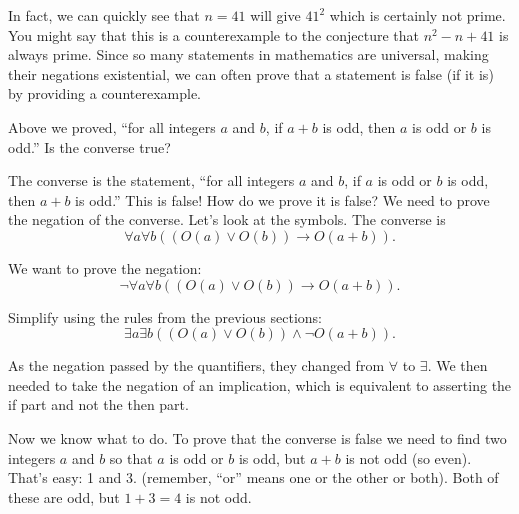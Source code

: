 \documentclass[11pt,]{book}
\theoremstyle{ptxplainnotitle}
\theoremstyle{ptxplaintitle}
\theoremstyle{ptxdefinitionnotitle}
\theoremstyle{ptxdefinitiontitle}
\theoremstyle{ptxdefinitionnotitle}
\theoremstyle{ptxdefinitiontitle}
\theoremstyle{ptxdefinitionnotitle}
\theoremstyle{ptxdefinitiontitle}
\theoremstyle{ptxdefinitiontitlenonumber}
\theoremstyle{ptxdefinitiontitlenonumber}
\numberwithin{equation}{chapter}
\newcommand{\imp}{\rightarrow}
\begin{document}
\par
\hypertarget{p-2351}{}%
In fact, we can quickly see that \(n = 41\) will give \(41^2\) which is certainly not prime. You might say that this is a counterexample to the conjecture that \(n^2 - n + 41\) is always prime. Since so many statements in mathematics are universal, making their negations existential, we can often prove that a statement is false (if it is) by providing a counterexample.%
\begin{example}\label{example-71}
\hypertarget{p-2352}{}%
Above we proved, ``for all integers \(a\) and \(b\), if \(a+b\) is odd, then \(a\) is odd or \(b\) is odd.'' Is the converse true?%
\par\smallskip%
\noindent\textbf{}\hypertarget{solution-258}{}\hypertarget{p-2353}{}%
The converse is the statement, ``for all integers \(a\) and \(b\), if \(a\) is odd or \(b\) is odd, then \(a + b\) is odd.'' This is false! How do we prove it is false? We need to prove the negation of the converse. Let's look at the symbols. The converse is%
\begin{equation*}
\forall a \forall b ((O(a) \vee O(b)) \imp O(a+b)).
\end{equation*}
%
\par
\hypertarget{p-2354}{}%
We want to prove the negation:%
\begin{equation*}
\neg \forall a \forall b ((O(a) \vee O(b)) \imp O(a+b)).
\end{equation*}
%
\par
\hypertarget{p-2355}{}%
Simplify using the rules from the previous sections:%
\begin{equation*}
\exists a \exists b ((O(a) \vee O(b)) \wedge \neg O(a+b)).
\end{equation*}
%
\par
\hypertarget{p-2356}{}%
As the negation passed by the quantifiers, they changed from \(\forall\) to \(\exists\). We then needed to take the negation of an implication, which is equivalent to asserting the if part and not the then part.%
\par
\hypertarget{p-2357}{}%
Now we know what to do. To prove that the converse is false we need to find two integers \(a\) and \(b\) so that \(a\) is odd or \(b\) is odd, but \(a+b\) is not odd (so even). That's easy: 1 and 3. (remember, ``or'' means one or the other or both). Both of these are odd, but \(1+3 = 4\) is not odd.%
\end{example}
\typeout{************************************************}
\typeout{************************************************}
\end{document}
